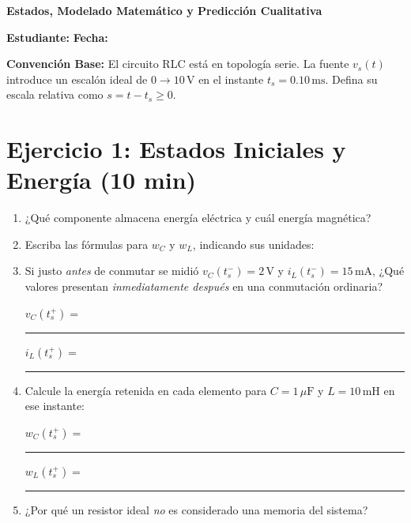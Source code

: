 \documentclass[11pt, a4paper]{article}
\begin{document}
\begin{tcolorbox}[colback=ucbblue!5!white, colframe=ucbblue, title=\textbf{Taller Individual: Circuito RLC de Segundo Orden}]
    \centering \textbf{Estados, Modelado Matemático y Predicción Cualitativa}
\end{tcolorbox}

\textbf{Estudiante:} \hrulefill \quad \textbf{Fecha:} \hrulefill

\vspace{0.3cm}
\noindent \textbf{Convención Base:} El circuito RLC está en topología serie. La fuente $v_s(t)$ introduce un escalón ideal de $0 \to 10\,\text{V}$ en el instante $t_s = 0.10\,\text{ms}$. Defina su escala relativa como $s = t - t_s \ge 0$.

\section*{Ejercicio 1: Estados Iniciales y Energía (10 min)}
\begin{enumerate}\setlength\itemsep{0.5cm}
    \item ¿Qué componente almacena energía eléctrica y cuál energía magnética? \par
    \vspace{0.1cm}
    \hrulefill
    
    \item Escriba las fórmulas para $w_C$ y $w_L$, indicando sus unidades: \par
    \vspace{0.1cm}
    \hrulefill
    
    \item Si justo \textit{antes} de conmutar se midió $v_C(t_s^-) = 2\,\text{V}$ y $i_L(t_s^-) = 15\,\text{mA}$, ¿Qué valores presentan \textit{inmediatamente después} en una conmutación ordinaria? \par
    \vspace{0.1cm}
    $v_C(t_s^+) = $ \rule{4cm}{0.4pt} \hfill $i_L(t_s^+) = $ \rule{4cm}{0.4pt}
    
    \item Calcule la energía retenida en cada elemento para $C=1\,\mu\text{F}$ y $L=10\,\text{mH}$ en ese instante: \par
    \vspace{0.1cm}
    $w_C(t_s^+) = $ \rule{4cm}{0.4pt} \hfill $w_L(t_s^+) = $ \rule{4cm}{0.4pt}
    
    \item ¿Por qué un resistor ideal \textit{no} es considerado una memoria del sistema? \par
    \vspace{0.1cm}
    \hrulefill
\end{enumerate}
\end{document}
